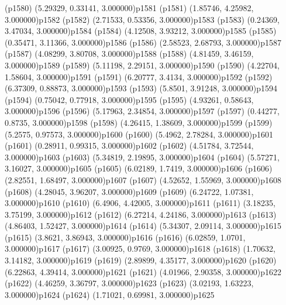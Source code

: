 \psdot(p1580)
\psPoint(5.29329, 0.33141, 3.000000){p1581}
\psdot(p1581)
\psPoint(1.85746, 4.25982, 3.000000){p1582}
\psdot(p1582)
\psPoint(2.71533, 0.53356, 3.000000){p1583}
\psdot(p1583)
\psPoint(0.24369, 3.47034, 3.000000){p1584}
\psdot(p1584)
\psPoint(4.12508, 3.93212, 3.000000){p1585}
\psdot(p1585)
\psPoint(0.35471, 3.11366, 3.000000){p1586}
\psdot(p1586)
\psPoint(2.58523, 2.68793, 3.000000){p1587}
\psdot(p1587)
\psPoint(4.08299, 3.80708, 3.000000){p1588}
\psdot(p1588)
\psPoint(4.81459, 3.46159, 3.000000){p1589}
\psdot(p1589)
\psPoint(5.11198, 2.29151, 3.000000){p1590}
\psdot(p1590)
\psPoint(4.22704, 1.58604, 3.000000){p1591}
\psdot(p1591)
\psPoint(6.20777, 3.4134, 3.000000){p1592}
\psdot(p1592)
\psPoint(6.37309, 0.88873, 3.000000){p1593}
\psdot(p1593)
\psPoint(5.8501, 3.91248, 3.000000){p1594}
\psdot(p1594)
\psPoint(0.75042, 0.77918, 3.000000){p1595}
\psdot(p1595)
\psPoint(4.93261, 0.58643, 3.000000){p1596}
\psdot(p1596)
\psPoint(5.17963, 2.34854, 3.000000){p1597}
\psdot(p1597)
\psPoint(0.44277, 0.8735, 3.000000){p1598}
\psdot(p1598)
\psPoint(4.26415, 1.38609, 3.000000){p1599}
\psdot(p1599)
\psPoint(5.2575, 0.97573, 3.000000){p1600}
\psdot(p1600)
\psPoint(5.4962, 2.78284, 3.000000){p1601}
\psdot(p1601)
\psPoint(0.28911, 0.99315, 3.000000){p1602}
\psdot(p1602)
\psPoint(4.51784, 3.72544, 3.000000){p1603}
\psdot(p1603)
\psPoint(5.34819, 2.19895, 3.000000){p1604}
\psdot(p1604)
\psPoint(5.57271, 3.16027, 3.000000){p1605}
\psdot(p1605)
\psPoint(6.02189, 1.7419, 3.000000){p1606}
\psdot(p1606)
\psPoint(2.82551, 1.68497, 3.000000){p1607}
\psdot(p1607)
\psPoint(4.52652, 1.55969, 3.000000){p1608}
\psdot(p1608)
\psPoint(4.28045, 3.96207, 3.000000){p1609}
\psdot(p1609)
\psPoint(6.24722, 1.07381, 3.000000){p1610}
\psdot(p1610)
\psPoint(6.4906, 4.42005, 3.000000){p1611}
\psdot(p1611)
\psPoint(3.18235, 3.75199, 3.000000){p1612}
\psdot(p1612)
\psPoint(6.27214, 4.24186, 3.000000){p1613}
\psdot(p1613)
\psPoint(4.86403, 1.52427, 3.000000){p1614}
\psdot(p1614)
\psPoint(5.34307, 2.09114, 3.000000){p1615}
\psdot(p1615)
\psPoint(3.8621, 3.86943, 3.000000){p1616}
\psdot(p1616)
\psPoint(6.02859, 1.0701, 3.000000){p1617}
\psdot(p1617)
\psPoint(3.00925, 0.9769, 3.000000){p1618}
\psdot(p1618)
\psPoint(1.70632, 3.14182, 3.000000){p1619}
\psdot(p1619)
\psPoint(2.89899, 4.35177, 3.000000){p1620}
\psdot(p1620)
\psPoint(6.22863, 4.39414, 3.000000){p1621}
\psdot(p1621)
\psPoint(4.01966, 2.90358, 3.000000){p1622}
\psdot(p1622)
\psPoint(4.46259, 3.36797, 3.000000){p1623}
\psdot(p1623)
\psPoint(3.02193, 1.63223, 3.000000){p1624}
\psdot(p1624)
\psPoint(1.71021, 0.69981, 3.000000){p1625}
